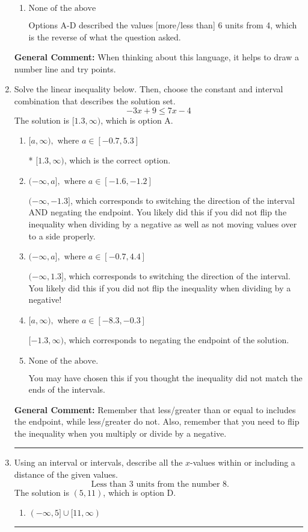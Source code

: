 \documentclass{extbook}[14pt]
\newcommand{\litem}[1]{\item #1

\rule{\textwidth}{0.4pt}}
\begin{document}
\begin{enumerate}
{\begin{enumerate}[label=\Alph*.]
This describes the values no more than 6 from 4
\item \( \text{None of the above} \)

Options A-D described the values [more/less than] 6 units from 4, which is the reverse of what the question asked.
\end{enumerate}

\textbf{General Comment:} When thinking about this language, it helps to draw a number line and try points.
}
\litem{
Solve the linear inequality below. Then, choose the constant and interval combination that describes the solution set.
\[ -3x + 9 \leq 7x -4 \]
The solution is \( [1.3, \infty) \), which is option A.\begin{enumerate}[label=\Alph*.]
\item \( [a, \infty), \text{ where } a \in [-0.7, 5.3] \)

* $[1.3, \infty)$, which is the correct option.
\item \( (-\infty, a], \text{ where } a \in [-1.6, -1.2] \)

 $(-\infty, -1.3]$, which corresponds to switching the direction of the interval AND negating the endpoint. You likely did this if you did not flip the inequality when dividing by a negative as well as not moving values over to a side properly.
\item \( (-\infty, a], \text{ where } a \in [-0.7, 4.4] \)

 $(-\infty, 1.3]$, which corresponds to switching the direction of the interval. You likely did this if you did not flip the inequality when dividing by a negative!
\item \( [a, \infty), \text{ where } a \in [-8.3, -0.3] \)

 $[-1.3, \infty)$, which corresponds to negating the endpoint of the solution.
\item \( \text{None of the above}. \)

You may have chosen this if you thought the inequality did not match the ends of the intervals.
\end{enumerate}

\textbf{General Comment:} Remember that less/greater than or equal to includes the endpoint, while less/greater do not. Also, remember that you need to flip the inequality when you multiply or divide by a negative.
}
\litem{
Using an interval or intervals, describe all the $x$-values within or including a distance of the given values.
\[ \text{ Less than } 3 \text{ units from the number } 8. \]
The solution is \( (5, 11) \), which is option D.\begin{enumerate}[label=\Alph*.]
\item \( (-\infty, 5] \cup [11, \infty) \)


\end{enumerate}}
\end{enumerate}
\end{document}
